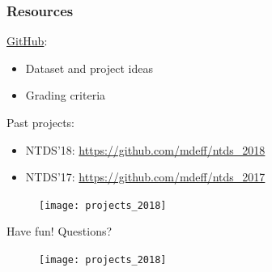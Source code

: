 \documentclass[aspectratio=169]{beamer}
\begin{document}

\begin{frame}
	\frametitle{Resources}
	\href{https://github.com/mdeff/ntds_2019}{GitHub}:
	\begin{itemize}
		\vspace{0.5em}
		\item Dataset and project ideas
		\vspace{0.5em}
		\item Grading criteria
	\end{itemize}
	\vfill
	Past projects:
	\begin{itemize}
		\vspace{0.5em}
		\item NTDS'18: \url{https://github.com/mdeff/ntds_2018}
		\vspace{0.5em}
		\item NTDS'17: \url{https://github.com/mdeff/ntds_2017}
	\end{itemize}
\end{frame}


\begin{frame}
	\begin{figure}
		\centering
		\texttt{[image: projects\_2018]}
	\end{figure}
	\begin{center}
		\Huge Have fun!
		\hspace{2em}
		\Huge Questions?
	\end{center}
	\begin{figure}
		\centering
		\texttt{[image: projects\_2018]}
	\end{figure}
\end{frame}

\end{document}
